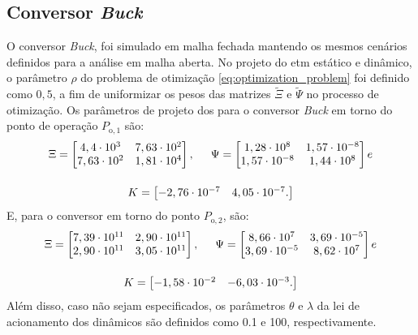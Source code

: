 \subsection{Conversor \textit{Buck}}

O conversor \textit{Buck}, foi simulado em malha fechada mantendo os mesmos cenários definidos para a análise em malha aberta. No projeto do \acrshort{etm} estático e dinâmico, o parâmetro $\rho$ do problema de otimização \eqref{eq:optimization_problem} foi definido como $0,5$, a fim de uniformizar os pesos das matrizes $\tilde{\Xi}$ e $\tilde{\Psi}$ no processo de otimização. Os parâmetros de projeto dos  para o conversor \textit{Buck} em torno do ponto de operação $P_{\mathrm{o}, 1}$ são: \begin{gather}
  \Xi = \begin{bmatrix}
    4,4 \cdot 10^3  & 7,63 \cdot 10^2 \\
    7,63 \cdot 10^2 & 1,81 \cdot 10^4 \\
  \end{bmatrix}, \hspace{.5cm}
  \Psi = \begin{bmatrix}
    1,28 \cdot 10^8    & 1,57 \cdot 10^{-8} \\
    1,57 \cdot 10^{-8} & 1,44 \cdot 10^8    \\
  \end{bmatrix} e \notag \\[12pt]
  K = \begin{bmatrix}
    -2,76 \cdot 10^{-7} & 4,05 \cdot 10^{-7}. \notag
  \end{bmatrix}
\end{gather} E, para o conversor em torno do ponto $P_{\mathrm{o}, 2}$, são: \begin{gather}
  \Xi = \begin{bmatrix}
    7,39 \cdot 10^{11} & 2,90 \cdot 10^{11} \\
    2,90 \cdot 10^{11} & 3,05 \cdot 10^{11} \\
  \end{bmatrix}, \hspace{.5cm}
  \Psi = \begin{bmatrix}
    8,66 \cdot 10^7    & 3,69 \cdot 10^{-5} \\
    3,69 \cdot 10^{-5} & 8,62 \cdot 10^7    \\
  \end{bmatrix} e \notag \\[12pt]
  K = \begin{bmatrix}
    -1,58 \cdot 10^{-2} & -6,03 \cdot 10^{-3}. \notag
  \end{bmatrix}
\end{gather} Além disso, caso não sejam especificados, os parâmetros $\theta$ e $\lambda$ da lei de acionamento dos  dinâmicos são definidos como 0.1 e 100, respectivamente.

